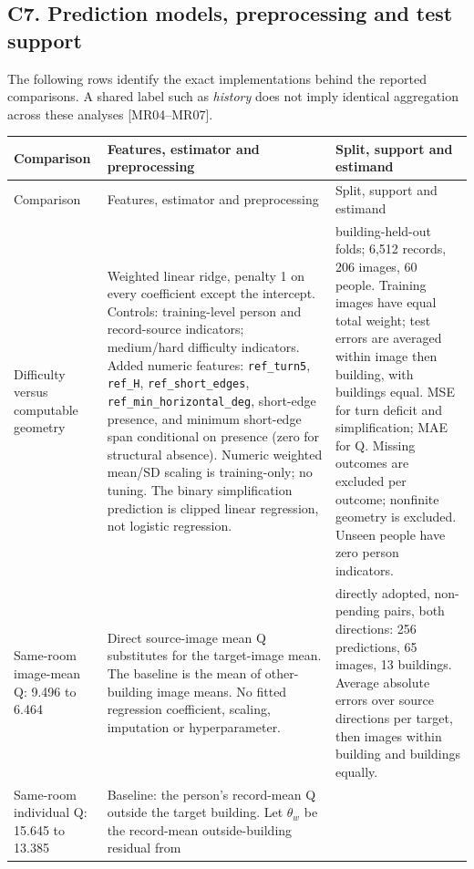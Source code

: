 \subsection*{C7. Prediction models, preprocessing and test support}
The following rows identify the exact implementations behind the reported
comparisons. A shared label such as \emph{history} does not imply identical
aggregation across these analyses [MR04--MR07].

\begingroup\small
\begin{longtable}{>{\raggedright\arraybackslash}p{.19\linewidth}>{\raggedright\arraybackslash}p{.49\linewidth}>{\raggedright\arraybackslash}p{.23\linewidth}}
\toprule
Comparison & Features, estimator and preprocessing & Split, support and estimand \\
\midrule\endfirsthead
\toprule Comparison & Features, estimator and preprocessing & Split, support and estimand \\
\midrule\endhead
Difficulty versus computable geometry
&
Weighted linear ridge, penalty 1 on every coefficient except the intercept.
Controls: training-level person and record-source indicators; medium/hard
difficulty indicators. Added numeric features:
\texttt{ref\_turn5}, \texttt{ref\_H}, \texttt{ref\_short\_edges},
\texttt{ref\_min\_horizontal\_deg}, short-edge presence, and minimum
short-edge span conditional on presence (zero for structural absence).
Numeric weighted mean/SD scaling is training-only; no tuning.
The binary simplification prediction is clipped linear regression,
not logistic regression.
&
22 building-held-out folds; 6,512 records, 206 images, 60 people.
Training images have equal total weight; test errors are averaged within
image then building, with buildings equal.
MSE for turn deficit and simplification; MAE for Q.
Missing outcomes are excluded per outcome; nonfinite geometry is excluded.
Unseen people have zero person indicators.
\\[3pt]
Same-room image-mean Q:
9.496 to 6.464
&
Direct source-image mean Q substitutes for the target-image mean.
The baseline is the mean of other-building image means.
No fitted regression coefficient, scaling, imputation or hyperparameter.
&
128 directly adopted, non-pending pairs, both directions:
256 predictions, 65 images, 13 buildings.
Average absolute errors over source directions per target,
then images within building and buildings equally.
\\[3pt]
Same-room individual Q:
15.645 to 13.385
&
Baseline: the person's record-mean Q outside the target building.
Let $\theta_w$ be the record-mean outside-building residual from

\end{longtable}
